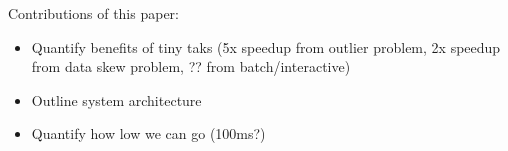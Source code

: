 Contributions of this paper:
\begin{itemize}
\item Quantify benefits of tiny taks (5x speedup from outlier problem, 2x speedup
from data skew problem, ?? from batch/interactive)
\item Outline system architecture
\item Quantify how low we can go (100ms?)
\end{itemize}

\begin{comment}
Today's datacenters run increasingly diverse workloads. A decade ago, compute
clusters were designed for batch workloads: a typical job took hours to complete.
As users migrated large amounts of data to these clusters, they demanded ever
faster access to this data, spurring low-latency frameworks (e.g., Dremel, Spark,
Shark, Impala) that stripe work across thousands of machines or store data in
memory in order to complete jobs in seconds. While data analysts and user-facing
services rely on these low-latency frameworks, clusters continue to run
long-running, batch jobs (e.g., indexing the web), leading to a diverse mix of
job runtimes.  Workload studies from Facebook, Microsoft, Yahoo!, and Google
corroborate this claim, finding that job completion times range from seconds to days.
\end{comment}
